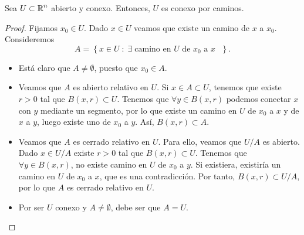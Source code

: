 \begin{theorem}
	Sea $\displaystyle U \subset \mathbb{R}^{n} $ abierto y conexo. Entonces, $\displaystyle U $ es conexo por caminos.
\end{theorem}
\begin{proof}
	Fijamos $\displaystyle x_{0} \in U $. Dado $\displaystyle x \in U $ veamos que existe un camino de $\displaystyle x $ a $\displaystyle x_{0} $. Consideremos  
	\[ A = \left\{ x \in U \; : \; \exists \; \text{camino en $\displaystyle U $ de $\displaystyle x_{0} $ a $\displaystyle x $ }\right\} .\]
	\begin{itemize}
	\item Está claro que $\displaystyle A \neq \emptyset $, puesto que $\displaystyle x_{0} \in A $. 
	\item Veamos que $\displaystyle A $ es abierto relativo en $\displaystyle U $. Si $\displaystyle x \in A \subset U $, tenemos que existe $\displaystyle r > 0 $ tal que $\displaystyle B\left(x,r\right) \subset U $. Tenemos que $\displaystyle \forall y \in B\left(x,r\right) $ podemos conectar $\displaystyle x $ con $\displaystyle y $ mediante un segmento, por lo que existe un camino en $\displaystyle U $ de $\displaystyle x_{0} $ a $\displaystyle x $ y de $\displaystyle x $ a $\displaystyle y $, luego existe uno de $\displaystyle x_{0} $ a $\displaystyle y $. Así, $\displaystyle B\left(x,r\right) \subset A $. 
	\item Veamos que $\displaystyle A $ es cerrado relativo en $\displaystyle U $. Para ello, veamos que $\displaystyle U/A $ es abierto. Dado $\displaystyle x \in U/A $ existe $\displaystyle r>0 $ tal que $\displaystyle B\left(x,r\right) \subset U $. Tenemos que $\displaystyle \forall y \in B\left(x,r\right) $, no existe camino en $\displaystyle U $ de $\displaystyle x_{0} $ a $\displaystyle y $. 
		Si existiera, existiría un camino en $\displaystyle U $ de $\displaystyle x_{0} $ a $\displaystyle x $, que es una contradicción. Por tanto, $\displaystyle B\left(x,r\right) \subset U / A $, por lo que $\displaystyle A $ es cerrado relativo en $\displaystyle U $.
	\item Por ser $\displaystyle U $ conexo y $\displaystyle A \neq \emptyset $, debe ser que $\displaystyle A = U $.
	\end{itemize}
\end{proof}
